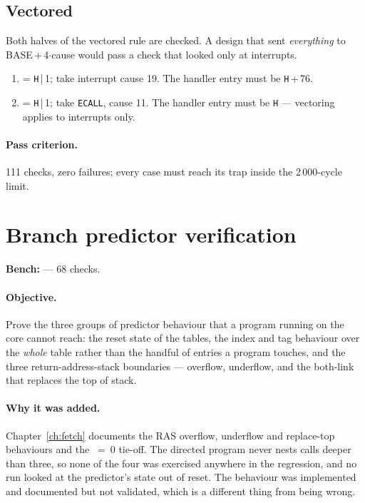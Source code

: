 \subsection*{Vectored }

Both halves of the vectored rule are checked. A design that sent
\emph{everything} to BASE\,+\,4$\cdot$cause would pass a check that looked
only at interrupts.

\begin{enumerate}[leftmargin=*,itemsep=2pt]
\item {} = \texttt{H}\,|\,1; take interrupt cause 19. The handler entry
must be \texttt{H}\,+\,76.
\item {} = \texttt{H}\,|\,1; take \texttt{ECALL}, cause 11. The handler
entry must be \texttt{H} --- vectoring applies to interrupts only.
\end{enumerate}

\paragraph{Pass criterion.} 111 checks, zero failures; every case must reach its
trap inside the 2\,000-cycle limit.

\section{Branch predictor verification}
\label{sec:vp-bp}

\textbf{Bench:}  --- 68 checks.

\paragraph{Objective.} Prove the three groups of predictor behaviour that a
program running on the core cannot reach: the reset state of the tables, the
index and tag behaviour over the \emph{whole} table rather than the handful of
entries a program touches, and the three return-address-stack boundaries ---
overflow, underflow, and the both-link  that replaces the top of
stack.

\paragraph{Why it was added.} Chapter~\ref{ch:fetch} documents the RAS
overflow, underflow and replace-top behaviours and the ~=~0
tie-off. The directed program never nests calls deeper than three, so none of
the four was exercised anywhere in the regression, and no run looked at the
predictor's state out of reset. The behaviour was implemented and documented but
not validated, which is a different thing from being wrong.

